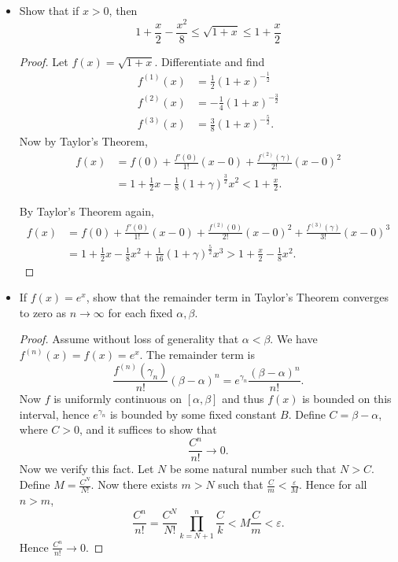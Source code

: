 \begin{itemize}
\item [28.B.] Show that if $x>0$, then
\[
1+\frac{x}{2}-\frac{x^2}{8} \leq \sqrt{1+x} \leq 1+\frac{x}{2}
\]
\begin{proof}
	Let $f(x) = \sqrt{1+x} $. Differentiate and find
	\begin{align*}
		f^{(1)}(x) &= \frac{1}{2} (1+x)^{-\frac{1}{2}} \\
		f^{(2)}(x) &= -\frac{1}{4}(1+x)^{-\frac{3}{2}} \\
		f^{(3)}(x) &= \frac{3}{8}(1+x)^{-\frac{5}{2}} 
	.\end{align*} 
	Now by Taylor's Theorem,
	 \begin{align*}
		 f(x) &= f(0) + \frac{f'(0)}{1!}(x-0) + \frac{ f^{(2)}(\gamma)}{2!}(x-0)^2 \\
		 &= 1 + \frac{1}{2} x - \frac{1}{8} ( 1+\gamma)^{\frac{3}{2}} x^2 < 1 + \frac{x}{2}
	.\end{align*} 

	By Taylor's Theorem again,
	\begin{align*}
		 f(x) &= f(0) + \frac{f'(0)}{1!}(x-0) + \frac{ f^{(2)}(0)}{2!}(x-0)^2 + \frac{f^{(3)}(\gamma)}{3!}(x-0)^3\\
		 &= 1 + \frac{1}{2} x - \frac{1}{8} x^2 + \frac{1}{16} (1+\gamma)^{\frac{5}{2}}x^3 > 1 + \frac{x}{2}-\frac{1}{8} x^2
	.\end{align*}
\end{proof}

\item [28.K.] If $f(x)=e^x$, show that the remainder term in Taylor's Theorem converges to zero as $n \rightarrow \infty$ for each fixed $\alpha, \beta$.
\begin{proof}
	Assume without loss of generality that $\alpha < \beta$. We have $f^{(n)}(x) = f(x) = e^x$. The remainder term is
	\[
		\frac{f^{(n)}(\gamma_n)}{n!}(\beta-\alpha)^n
		= e^{\gamma_n} \frac{(\beta-\alpha)^n}{n!}
	.\] 
	Now $f$ is uniformly continuous on $[\alpha,\beta]$ and thus $f(x)$ is bounded on this interval, hence $e^{\gamma_n}$ is bounded by some fixed constant  $B$. Define $C = \beta - \alpha$, where $C > 0$, and it suffices to show that
	\[
		\frac{C^n}{n!} \to 0
	.\] 
	 Now we verify this fact. Let $N$ be some natural number such that $N > C$. Define $M = \frac{C^N}{N!}$. Now there exists $m > N$ such that $\frac{C}{m} < \frac{\varepsilon}{M}$. Hence for all $n > m$,
	 \[
	 	\frac{C^n}{n!} = \frac{C^N}{N!}\prod_{k=N+1}^{n} \frac{C}{k} < M \frac{C}{m} < \varepsilon
	 .\] 
	 Hence $\frac{C^n}{n!}\to 0$.
\end{proof}


\end{itemize}
